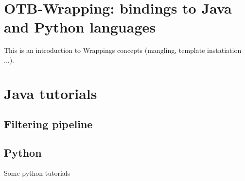 \section{OTB-Wrapping: bindings to Java and Python languages}

This is an introduction to Wrappings concepts (mangling, template instatiation ...).

\section{Java tutorials}

\subsection{Filtering pipeline}



\subsection{Python}

Some python tutorials
